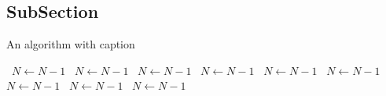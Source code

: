 \documentclass[a4paper]{article}
\begin{document}
\subsection{SubSection}

\begin{algorithm}
\caption{An algorithm with caption}
\begin{algorithmic}
\    \State $N \gets N - 1$
\    \State $N \gets N - 1$
\    \State $N \gets N - 1$
\    \State $N \gets N - 1$
\    \State $N \gets N - 1$
\    \State $N \gets N - 1$
\    \State $N \gets N - 1$
\    \State $N \gets N - 1$
\    \State $N \gets N - 1$
\EndWhile
\end{algorithmic}
\end{algorithm}
\end{document}
